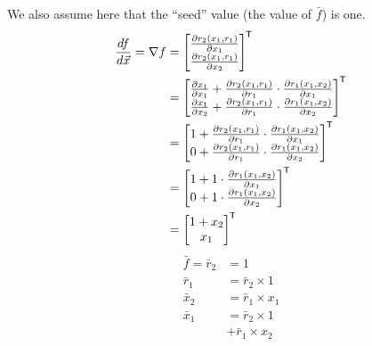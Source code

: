     We also assume here that the ``seed'' value (the value of $\bar{f}$) is one.
    \begin{equation} \label{eq:reverse_ex}
        \begin{aligned}
            \frac{df}{d\vec{x}}=\nabla f&=\begin{bmatrix}
                \frac{\partial r_2(x_1,r_1)}{\partial x_1}\\
                \frac{\partial r_2(x_1,r_1)}{\partial x_2}
            \end{bmatrix}^{\mkern-1.5mu\mathsf{T}}\\
            &=\begin{bmatrix}
                \frac{\partial x_1}{\partial x_1}+\frac{\partial r_2(x_1,r_1)}{\partial r_1}\cdot\frac{\partial r_1(x_1,x_2)}{\partial x_1}\\
                \frac{\partial x_1}{\partial x_2}+\frac{\partial r_2(x_1,r_1)}{\partial r_1}\cdot\frac{\partial r_1(x_1,x_2)}{\partial x_2}
            \end{bmatrix}^{\mkern-1.5mu\mathsf{T}}\\
            &=\begin{bmatrix}
                1+\frac{\partial r_2(x_1,r_1)}{\partial r_1}\cdot\frac{\partial r_1(x_1,x_2)}{\partial x_1}\\
                0+\frac{\partial r_2(x_1,r_1)}{\partial r_1}\cdot\frac{\partial r_1(x_1,x_2)}{\partial x_2}
            \end{bmatrix}^{\mkern-1.5mu\mathsf{T}}\\
            &=\begin{bmatrix}
                1+1\cdot\frac{\partial r_1(x_1,x_2)}{\partial x_1}\\
                0+1\cdot\frac{\partial r_1(x_1,x_2)}{\partial x_2}
            \end{bmatrix}^{\mkern-1.5mu\mathsf{T}}\\
            &=\begin{bmatrix}
                1+x_2\\
                x_1
            \end{bmatrix}^{\mkern-1.5mu\mathsf{T}}
        \end{aligned}
    \end{equation}
    \begin{equation} \label{eq:reverse_ex2}
        \begin{aligned}
            \bar{f}=\bar{r}_2&=1\\
            \bar{r}_1&=\bar{r}_2\times1\\
            \bar{x}_2&=\bar{r}_1\times x_1\\
            \bar{x}_1&=\bar{r}_2\times1\\
            &+\bar{r}_1\times x_2
        \end{aligned}
    \end{equation}
